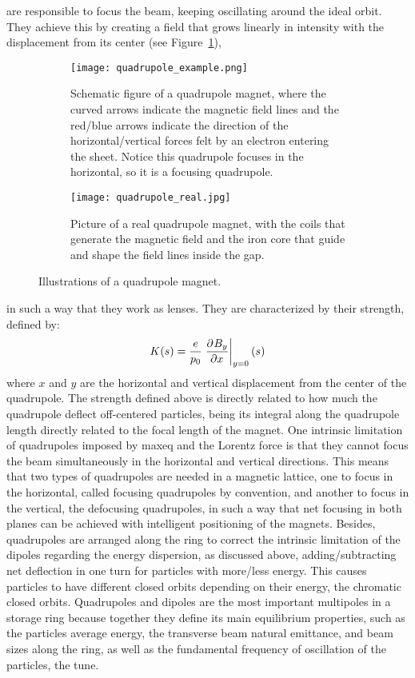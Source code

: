 \begin{description}[align=left]
        \item[Quadrupoles:] are responsible to focus the beam, keeping oscillating around the ideal orbit. They achieve this by creating a field that grows linearly in intensity with the displacement from its center (see Figure~\ref{fig:quadrupole}),
        \begin{figure}
            \centering
            \begin{subfigure}[c]{0.47\textwidth}
                \centering
                \texttt{[image: quadrupole\_example.png]}
                \caption{Schematic figure of a quadrupole magnet, where the curved arrows indicate the magnetic field lines and the red/blue arrows indicate the direction of the horizontal/vertical forces felt by an electron entering the sheet. Notice this quadrupole focuses in the horizontal, so it is a focusing quadrupole.}
            \end{subfigure}\hfill
            \begin{subfigure}[c]{0.5\textwidth}
                \texttt{[image: quadrupole\_real.jpg]}
                \caption{Picture of a real quadrupole magnet, with the coils that generate the magnetic field and the iron core that guide and shape the field lines inside the gap.}
            \end{subfigure}
            \caption{Illustrations of a quadrupole magnet.}
            \label{fig:quadrupole}
        \end{figure}
        in such a way that they work as lenses. They are characterized by their strength, defined by:
        \begin{align}
            K(s) = \frac{e}{p_0}\left.\frac{\partial^{{}}B_y}{\partial x^{{}}}\right|_{y=0}(s)
        \end{align}
        where $x$ and $y$ are the horizontal and vertical displacement from the center of the quadrupole. The strength defined above is directly related to how much the quadrupole deflect off-centered particles, being its integral along the quadrupole length directly related to the focal length of the magnet. One intrinsic limitation of quadrupoles imposed by \gls{maxeq} and the Lorentz force is that they cannot focus the beam simultaneously in the horizontal and vertical directions. This means that two types of quadrupoles are needed in a magnetic lattice, one to focus in the horizontal, called focusing quadrupoles by convention, and another to focus in the vertical, the defocusing quadrupoles, in such a way that net focusing in both planes can be achieved with intelligent positioning of the magnets. Besides, quadrupoles are arranged along the ring to correct the intrinsic limitation of the dipoles regarding the energy dispersion, as discussed above, adding/subtracting net deflection in one turn for particles with more/less energy. This causes particles to have different closed orbits depending on their energy, the chromatic closed orbits. Quadrupoles and dipoles are the most important multipoles in a storage ring because together they define its main equilibrium properties, such as the particles average energy, the transverse beam natural emittance, and beam sizes along the ring, as well as the fundamental frequency of oscillation of the particles, the tune.

\end{description}
